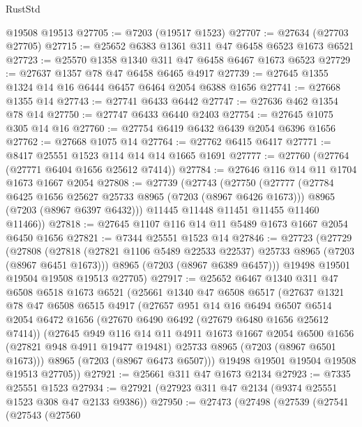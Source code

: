 \begin{lexlean}{RustStd}
\begin{coremodule}
    @19508
    @19513
@27705 := @7203 (@19517 @1523)
@27707 := @27634 (@27703 @27705)
@27715 := @25652 @6383 @1361 @311 @47 @6458 @6523 @1673 @6521
@27723 := @25570 @1358 @1340 @311 @47 @6458 @6467 @1673 @6523
@27729 := @27637 @1357 @78 @47 @6458 @6465 @4917
@27739 := @27645 @1355 @1324 @14 @16 @6444 @6457 @6464 @2054 @6388 @1656
@27741 := @27668 @1355 @14
@27743 := @27741 @6433 @6442
@27747 := @27636 @462 @1354 @78 @14
@27750 := @27747 @6433 @6440 @2403
@27754 := @27645 @1075 @305 @14 @16
@27760 := @27754 @6419 @6432 @6439 @2054 @6396 @1656
@27762 := @27668 @1075 @14
@27764 := @27762 @6415 @6417
@27771 := @8417 @25551 @1523 @114 @14 @14 @1665 @1691
@27777 := @27760 (@27764 (@27771 @6404 @1656 @25612 @7414))
@27784 := @27646 @116 @14 @11 @1704 @1673 @1667 @2054
@27808 := @27739
    (@27743
      (@27750
        (@27777
          (@27784 @6425 @1656 @25627 @25733 @8965 (@7203 (@8967 @6426 @1673)))
          @8965
          (@7203 (@8967 @6397 @6432)))
        @11445
        @11448
        @11451
        @11455
        @11460
        @11466))
@27818 := @27645 @1107 @116 @14 @11 @5489 @1673 @1667 @2054 @6450 @1656
@27821 := @7344 @25551 @1523 @14
@27846 := @27723
    (@27729
      (@27808
        (@27818 (@27821 @1106 @5489 @22533 @22537) @25733 @8965 (@7203 (@8967 @6451 @1673)))
        @8965
        (@7203 (@8967 @6389 @6457)))
      @19498
      @19501
      @19504
      @19508
      @19513
      @27705)
@27917 := @25652
    @6467
    @1340
    @311
    @47
    @6508
    @6518
    @1673
    @6521
    (@25661
      @1340
      @47
      @6508
      @6517
      (@27637
        @1321
        @78
        @47
        @6508
        @6515
        @4917
        (@27657
          @951
          @14
          @16
          @6494
          @6507
          @6514
          @2054
          @6472
          @1656
          (@27670 @6490 @6492 (@27679 @6480 @1656 @25612 @7414))
          (@27645
            @949
            @116
            @14
            @11
            @4911
            @1673
            @1667
            @2054
            @6500
            @1656
            (@27821 @948 @4911 @19477 @19481)
            @25733
            @8965
            (@7203 (@8967 @6501 @1673)))
          @8965
          (@7203 (@8967 @6473 @6507)))
        @19498
        @19501
        @19504
        @19508
        @19513
        @27705))
@27921 := @25661 @311 @47 @1673 @2134
@27923 := @7335 @25551 @1523
@27934 := @27921 (@27923 @311 @47 @2134 (@9374 @25551 @1523 @308 @47 @2133 @9386))
@27950 := @27473
    (@27498
      (@27539
        (@27541
          (@27543
            (@27560

\end{coremodule}
\end{lexlean}
